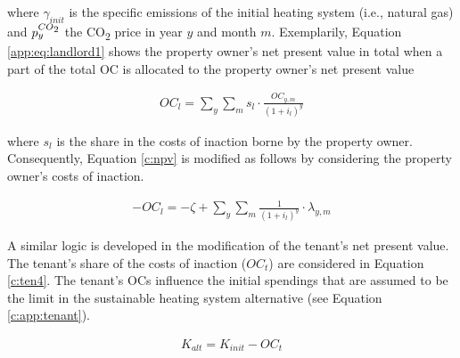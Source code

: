 \documentclass[review]{elsarticle}
\begin{document}
where $\gamma_{init}$ is the specific emissions of the initial heating system (i.e., natural gas) and $p_{y}^{CO\textsubscript{2}}$ the CO\textsubscript{2} price in year $y$ and month $m$. Exemplarily, Equation \ref{app:eq:landlord1} shows the property owner's net present value in total when a part of the total OC is allocated to the property owner's net present value

\begin{align}\label{app:eq:landlord1}
	OC_{l} =  \sum_{y} \sum_{m} s_l \cdot \frac{OC_{y,m}}{(1+i_l)^y} 
\end{align}

where $s_l$ is the share in the costs of inaction borne by the property owner. Consequently, Equation \ref{c:npv} is modified as follows by considering the property owner's costs of inaction.

\begin{align}\label{app:eq:landlord}
	-OC_{l} =  -\zeta + \sum_{y} \sum_{m} \frac{1}{(1+i_l)^y} \cdot \lambda_{y,m}
\end{align}

A similar logic is developed in the modification of the tenant's net present value. The tenant's share of the costs of inaction ($OC_{t}$) are considered in Equation \ref{c:ten4}. The tenant's OCs influence the initial spendings that are assumed to be the limit in the sustainable heating system alternative (see Equation \ref{c:app:tenant}).

\begin{align}\label{c:app:tenant}
	K_{alt} = K_{init} - OC_{t}
\end{align}
\end{document}
